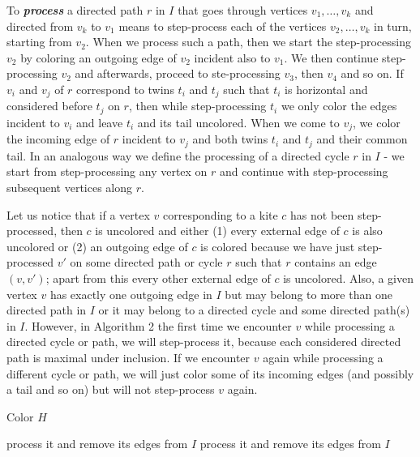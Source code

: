 \documentclass[a4, 11pt]{article}
\newcommand{\<}{\langle}
\renewcommand{\>}{\rangle}
\begin{document}
To {\bf \em process} a directed  path $r$ in $I$ that goes through vertices $v_1,  \ldots, v_k$ and directed from $v_k$ to $v_1$ means to step-process each of the vertices $v_2, \ldots, v_k$ in turn, starting from $v_2$.
When we process such a path, then we start the step-processing $v_2$ by coloring an outgoing edge of $v_2$ incident also to $v_1$.   We then continue step-processing  $v_2$ and afterwards, proceed to ste-processing $v_3$, then $v_4$ and so on. If $v_i$ and $v_j$ of $r$ correspond to twins $t_i$ and $t_j$ such that $t_i$ is horizontal and considered before $t_j$ on $r$, then while step-processing $t_i$ we only color the edges incident to $v_i$ and leave $t_i$ and its tail uncolored. When we come to $v_j$, we color the incoming edge of $r$ incident to $v_j$ and both twins $t_i$ and $t_j$ and their common tail.
In an analogous way we define the processing of a directed cycle $r$ in $I$ - we start from  step-processing any vertex on $r$ and continue with step-processing subsequent vertices along $r$.

Let us notice that if a vertex $v$ corresponding to a kite $c$ has not been step-processed, then $c$ is uncolored and either (1) every external 
edge of $c$ is also uncolored or (2) an outgoing edge of $c$ is colored because we have just step-processed $v'$ on some directed path or cycle $r$ such that $r$ contains an edge $(v,v')$; apart from this every other external edge of $c$ is uncolored. Also, a given vertex $v$  has exactly one outgoing edge in $I$ but may belong to more than one directed path in $I$ or it may belong to a directed cycle and some directed path(s) in $I$.  However, in Algorithm 2  the first time we encounter $v$ while processing a directed cycle or path, we will step-process it, because each considered directed path is maximal under inclusion. If we encounter $v$ again
while processing a different cycle or path, we will just color some of its incoming edges (and possibly a tail and so on) but will not step-process $v$ again.


\begin{algorithm} \label{AH}
	\caption{Color $H$}
	\label{alg:col_h}
	\begin{algorithmic}
	    \State process it and remove its edges from $I$
	  \EndWhile
	    \State process it and remove its edges from $I$
	  \EndWhile
		
	\end{algorithmic}
\end{algorithm}
\end{document}
